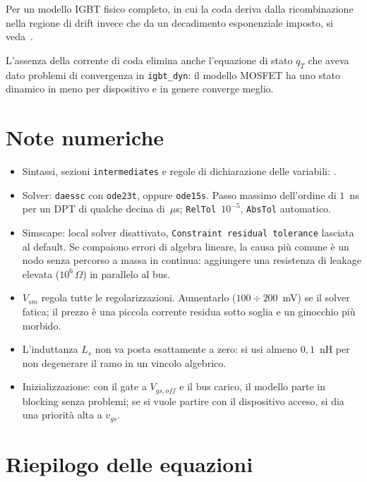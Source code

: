 \documentclass[11pt,a4paper]{article}
\newcommand{\ssc}[1]{\texttt{#1}}
\begin{document}
Per un modello IGBT fisico completo, in cui la coda deriva dalla ricombinazione
nella regione di drift invece che da un decadimento esponenziale imposto,
si veda~\cite{Hefner1994}.

L'assenza della corrente di coda elimina anche l'equazione di stato $q_T$
che aveva dato problemi di convergenza in \ssc{igbt\_dyn}: il modello
MOSFET ha uno stato dinamico in meno per dispositivo e in genere converge
meglio.

\section{Note numeriche}

\begin{itemize}
  \item Sintassi, sezioni \ssc{intermediates} e regole di dichiarazione delle
        variabili: \cite{MathWorksSSC}.
  \item Solver: \ssc{daessc} con \ssc{ode23t}, oppure \ssc{ode15s}. Passo
        massimo dell'ordine di $1$~ns per un DPT di qualche decina di~$\mu$s;
        \ssc{RelTol}~$10^{-5}$, \ssc{AbsTol} automatico.
  \item Simscape: local solver disattivato, \ssc{Constraint residual
        tolerance} lasciata al default. Se compaiono errori di algebra
        lineare, la causa più comune è un nodo senza percorso a massa in
        continua: aggiungere una resistenza di leakage elevata
        ($10^{6}\,\Omega$) in parallelo al bus.
  \item $V_{sm}$ regola tutte le regolarizzazioni. Aumentarlo
        ($100\div200$~mV) se il solver fatica; il prezzo è una piccola
        corrente residua sotto soglia e un ginocchio più morbido.
  \item L'induttanza $L_s$ non va posta esattamente a zero: si usi almeno
        $0{,}1$~nH per non degenerare il ramo in un vincolo algebrico.
  \item Inizializzazione: con il gate a $V_{gs,off}$ e il bus carico, il
        modello parte in blocking senza problemi; se si vuole partire con il
        dispositivo acceso, si dia una priorità alta a $v_{gs}$.
\end{itemize}

\section{Riepilogo delle equazioni}
\end{document}
